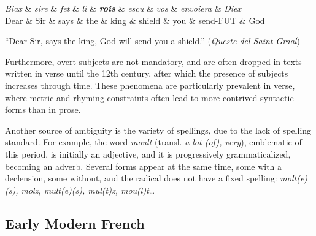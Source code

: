 \begin{center}
    \begin{dependency}[theme=simple]
        \begin{deptext}[row 2/.style={font=\small}]
            \textit{Biax} \& \textit{sire} \& \textit{fet} \& \textit{li} \& \textbf{\textit{rois}} \& \textit{escu} \& \textit{vos} \& \textit{envoiera} \& \textit{Diex} \\
            Dear \& Sir \& says \& the \& king \& shield \& you \& send-FUT \& God \\
        \end{deptext}
    \end{dependency}

    \raggedright
    \enquote{Dear Sir, says the king, God will send you a shield.} (\emph{Queste del Saint Graal})
\end{center}

Furthermore, overt subjects are not mandatory, and are often dropped in texts written in verse until the 12th century, after which the presence of subjects increases through time.
These phenomena are particularly prevalent in verse, where metric and rhyming constraints often lead to more contrived syntactic forms than in prose.

Another source of ambiguity is the variety of spellings, due to the lack of spelling standard. For example, the word \textit{moult} (transl. \textit{a lot (of), very}), emblematic of this period, is initially an adjective, and it is progressively grammaticalized, becoming an adverb. Several forms appear at the same time, some with a declension, some without, and the radical does not have a fixed spelling: \textit{molt(e)(s), molz, mult(e)(s), mul(t)z, mou(l)t}…

\subsection{Early Modern French}\label{def:early}

